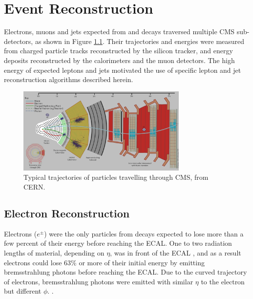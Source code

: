 \chapter{Event Reconstruction}
\label{sec:reco_chapter}

Electrons, muons and jets expected from \WR and \nul decays traversed multiple CMS sub-detectors, 
as shown in Figure \ref{fig:particleTrajectories}.  Their trajectories and energies were measured 
from charged particle tracks reconstructed by the silicon tracker, and energy deposits reconstructed 
by the calorimeters and the muon detectors.  The high energy of expected leptons and jets motivated 
the use of specific lepton and jet reconstruction algorithms described herein.

\begin{figure}[h]
	\centering
	\includegraphics[width=0.75\textwidth]{figures/flowOfParticlesThroughCMS.png}
	\caption{Typical trajectories of particles travelling through CMS, from CERN.}
	\label{fig:particleTrajectories}
\end{figure}


\section{Electron Reconstruction}
\label{sec:eleReco}
Electrons ($e^{\pm}$) were the only particles from \WR decays expected to lose more than a few percent of their 
energy before reaching the ECAL.  One to two radiation lengths of material, depending on $\eta$, was in front of 
the ECAL \cite{ecalPerformanceInCollisions}, and as a result electrons could lose 63\% or more of their initial 
energy by emitting bremsstrahlung photons before reaching the ECAL.  Due to the curved trajectory of electrons, 
bremsstrahlung photons were emitted with similar $\eta$ to the electron but different $\phi$.  .

